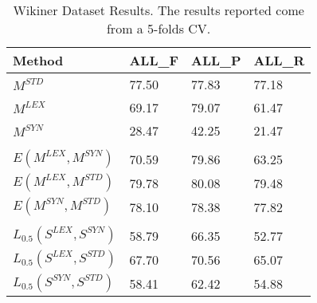
\def\rownumber{}
\begin{table*}[]
\centering
\begin{tabular}{@{}llll@{}}
\toprule
\textbf{Method} & \textbf{ALL\_F} & \textbf{ALL\_P} & \textbf{ALL\_R}\\ \midrule
$M^{STD}$                    & 77.50 & 77.83 & 77.18  \\ 
$M^{LEX}$                    & 69.17 & 79.07 & 61.47 \\
$M^{SYN}$                    & 28.47 & 42.25 & 21.47 \\
                             &       &       &       \\
$E(M^{LEX}, M^{SYN})$        & 70.59 & 79.86  & 63.25 \\
$E(M^{LEX}, M^{STD})$        & 79.78 & 80.08 & 79.48 \\
$E(M^{SYN}, M^{STD})$        & 78.10 & 78.38 & 77.82 \\
                             &       &       &       \\
$L_{0.5}(S^{LEX}, S^{SYN})$  & 58.79 & 66.35 & 52.77 \\
$L_{0.5}(S^{LEX}, S^{STD})$  & 67.70   & 70.56 & 65.07 \\
$L_{0.5}(S^{SYN}, S^{STD})$  & 58.41 & 62.42 & 54.88 \\ \bottomrule
\end{tabular} 
\caption{Wikiner Dataset Results. The results reported come from a 5-folds CV.}
\label{tab:wikigold}
\end{table*}





